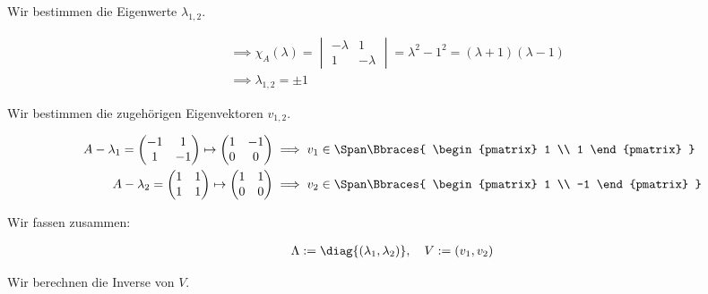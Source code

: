 \begin{solution}
Wir bestimmen die Eigenwerte $\lambda_{1, 2}$.

\begin{align*}
    & \implies
    \chi_A(\lambda)
    =
    \begin{vmatrix}
        -\lambda & 1 \\
         1       & -\lambda
    \end{vmatrix}
    =
    \lambda^2 - 1^2
    =
    (\lambda + 1)
    (\lambda - 1) \\
    & \implies
    \lambda_{1, 2} = \pm 1
\end{align*}

Wir bestimmen die zugehörigen Eigenvektoren $v_{1, 2}$.

\begin{align*}
    A - \lambda_1
    =
    \begin{pmatrix}
        -1 &  1 \\
         1 & -1
    \end{pmatrix}
    \mapsto
    \begin{pmatrix}
        1 & -1 \\
        0 &  0
    \end{pmatrix}
    & \implies
    v_1 \in
    \Span \Bbraces
    {
        \begin{pmatrix}
            1 \\ 1
        \end{pmatrix}
    } \\
    A - \lambda_2
    =
    \begin{pmatrix}
        1 & 1 \\
        1 & 1
    \end{pmatrix}
    \mapsto
    \begin{pmatrix}
        1 & 1 \\
        0 & 0
    \end{pmatrix}
    & \implies
    v_2 \in
    \Span \Bbraces
    {
        \begin{pmatrix}
            1 \\ -1
        \end{pmatrix}
    }
\end{align*}

Wir fassen zusammen:

\begin{align*}
    \Lambda := \diag{(\lambda_1, \lambda_2)},
    \quad
    V := (v_1, v_2)
\end{align*}

Wir berechnen die Inverse von $V$.


\end{solution}
